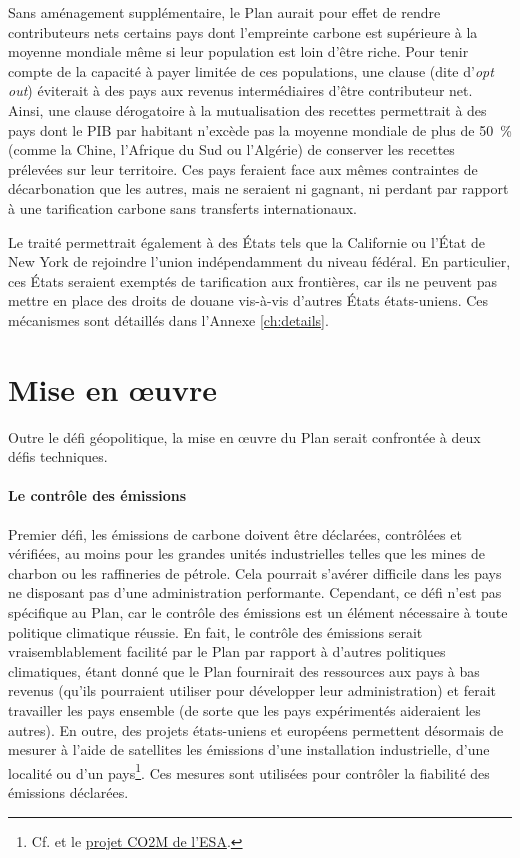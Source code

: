 \documentclass[a5paper,french,openany]{memoir}
\begin{document}
Sans aménagement supplémentaire, le Plan aurait pour effet de rendre contributeurs nets certains pays dont l'empreinte carbone est supérieure à la moyenne mondiale même si leur population est loin d'être riche. Pour tenir compte de la capacité à payer limitée de ces populations, une clause (dite d'\textit{opt out}) éviterait à des pays aux revenus intermédiaires d'être contributeur net. Ainsi, une clause dérogatoire à la mutualisation des recettes permettrait à des pays dont le PIB par habitant n'excède pas la moyenne mondiale de plus de 50~\% (comme la Chine, l'Afrique du Sud ou l'Algérie) de conserver les recettes prélevées sur leur territoire. Ces pays feraient face aux mêmes contraintes de décarbonation que les autres, mais ne seraient ni gagnant, ni perdant par rapport à une tarification carbone sans transferts internationaux. 

Le traité permettrait également à des États tels que la Californie ou l'État de New York de rejoindre l'union indépendamment du niveau fédéral. En particulier, ces États seraient exemptés de tarification aux frontières, car ils ne peuvent pas mettre en place des droits de douane vis-à-vis d'autres États états-uniens. 
Ces mécanismes sont détaillés dans l'Annexe \ref{ch:details}. 


\section{Mise en œuvre}\label{sec:implementation}
Outre le défi géopolitique, la mise en œuvre du Plan serait confrontée à deux défis techniques. 

\paragraph{Le contrôle des émissions}
Premier défi, les émissions de carbone doivent être déclarées, contrôlées et vérifiées, au moins %
pour les grandes unités industrielles telles que les mines de charbon ou les raffineries de pétrole. Cela pourrait s'avérer difficile dans les pays ne disposant pas d'une administration performante. Cependant, ce défi n'est pas spécifique au Plan, car le contrôle des émissions est un élément nécessaire à toute politique climatique réussie. En fait, le contrôle des émissions serait vraisemblablement facilité par le Plan par rapport à d'autres politiques climatiques, étant donné que le Plan fournirait des ressources aux pays à bas revenus (qu'ils pourraient utiliser pour développer leur administration) et ferait travailler les pays ensemble (de sorte que les pays expérimentés aideraient les autres). En outre, des projets états-uniens et européens permettent désormais de mesurer à l'aide de satellites les émissions d'une installation industrielle, d'une localité ou d'un pays\footnote{Cf. \cite{%
pan_potential_2021,shen_national_2023} et le \href{https://www.esa.int/Applications/Observing_the_Earth/Copernicus/Carbon_dioxide_monitoring_satellite_given_the_shakes}{projet CO2M de l'ESA}.}. Ces mesures sont utilisées pour contrôler la fiabilité des émissions déclarées.
\end{document}
